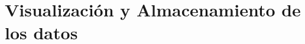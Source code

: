 \newpage
\thispagestyle{empty}
\mbox{}

\chapter{Visualización y Almacenamiento de los datos}
\label{ch:chapter4}

